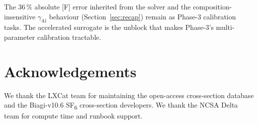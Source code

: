 \documentclass[11pt,a4paper]{article}
\begin{document}
The 36\,\% absolute [F] error inherited from the solver and the
composition-insensitive $\gamma_\mathrm{Al}$ behaviour
(Section~\ref{sec:recap}) remain as Phase-3 calibration tasks.
The accelerated surrogate is the unblock that makes Phase-3's
multi-parameter calibration tractable.

\section*{Acknowledgements}

We thank the LXCat team for maintaining the open-access cross-section
database and the Biagi-v10.6 SF\textsubscript{6} cross-section
developers.  We thank the NCSA Delta team for compute time and
runbook support.



\end{document}
